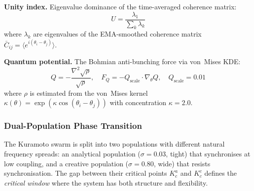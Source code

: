 \documentclass[11pt,a4paper,twocolumn]{article}
\begin{document}
\textbf{Unity index.} Eigenvalue dominance of the time-averaged coherence matrix:
\begin{equation}
U = \frac{\lambda_1}{\sum_k \lambda_k}
\end{equation}
where $\lambda_k$ are eigenvalues of the EMA-smoothed coherence matrix $\bar{C}_{ij} = \langle e^{i(\theta_i - \theta_j)} \rangle$.

\textbf{Quantum potential.} The Bohmian anti-bunching force via von~Mises KDE:
\begin{equation}
Q = -\frac{\nabla^2 \sqrt{\rho}}{\sqrt{\rho}}, \quad F_Q = -Q_{\mathrm{scale}} \cdot \nabla_\theta Q, \quad Q_{\mathrm{scale}} = 0.01
\end{equation}
where $\rho$ is estimated from the von~Mises kernel $\kappa(\theta) = \exp(\kappa \cos(\theta_i - \theta_j))$ with concentration $\kappa = 2.0$.

\subsubsection{Dual-Population Phase Transition}

The Kuramoto swarm is split into two populations with different natural frequency spreads:
an analytical population ($\sigma = 0.03$, tight) that synchronises at low coupling, and a
creative population ($\sigma = 0.80$, wide) that resists synchronisation. The gap between
their critical points $K_c^a$ and $K_c^c$ defines the \emph{critical window} where the
system has both structure and flexibility.
\end{document}

